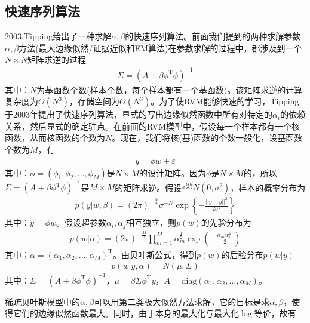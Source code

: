     \subsection{快速序列算法}
        2003.Tipping\cite{2003.Tipping}给出了一种求解$\alpha,\beta$的快速序列算法。前面我们提到的两种求解参数$\alpha,\beta$方法(最大边缘似然/证据近似和EM算法)在参数求解的过程中，都涉及到一个$N\times N$矩阵求逆的过程
        \begin{align*}
        \Sigma = (A+\beta\phi^\mathrm{T}\phi)^{-1}
        \end{align*}
        其中：$N$为基函数个数(样本个数，每个样本都有一个基函数)。该矩阵求逆的计算复杂度为$O(N^3)$，存储空间为$O(N^3)$。为了使RVM能够快速的学习，Tipping于2003年提出了快速序列算法，显式的写出边缘似然函数中所有对特定的$\alpha_i$的依赖关系，然后显式的确定驻点。在前面的RVM模型中，假设每一个样本都有一个核函数，从而核函数的个数为$N$。现在，我们将核(基)函数的个数一般化，设基函数个数为$M$，有
        \begin{align*}
        y = \phi w + \varepsilon
        \end{align*}
        其中：$\phi = (\phi_1,\phi_2,\dots,\phi_M)$是$N\times M$的设计矩阵。因为$\phi $是$N\times M$的，所以$\Sigma = (A+\beta\phi^\mathrm{T}\phi)^{-1}$是$M\times M$的矩阵求逆。假设$\varepsilon \overset{iid}{\sim}N(0,\sigma^2)$，样本的概率分布为
        \begin{align*}
        p(y|w,\beta) = (2\pi)^{-\frac{N}{2}}\sigma^{-N}\exp \left\{ -\frac{||y-\hat{y}||^2}{2\sigma^2} \right\}
        \end{align*}
        其中：$\hat{y} = \phi w$。假设超参数$\alpha_i,\alpha_j$相互独立，则$p(w)$的先验分布为
        \begin{align*}
        p(w|\alpha) = (2\pi)^{-\frac{M}{2}} \prod_{m=1}^M \alpha_m^\frac{1}{2} \exp \left( -\frac{\alpha_mw_m^2}{2} \right)
        \end{align*}
        其中；$\alpha = (\alpha_1,\alpha_2,\dots,\alpha_M)^\mathrm{T}$。由贝叶斯公式，得到$p(w)$的后验分布$p(w|y)$
        \begin{align*}
        p(w|y,\alpha) = N(\mu,\Sigma)
        \end{align*}
        其中：$\Sigma = (A+\beta\phi^\mathrm{T}\phi)^{-1}$，$\mu = \beta \Sigma \phi^\mathrm{T}y$，$A = \mathrm{diag}(\alpha_1,\alpha_2,\dots,\alpha_M)$。
        \par
        稀疏贝叶斯模型中的$\alpha,\beta$可以用第二类极大似然方法求解，它的目标是求$\alpha,\beta$，使得它们的边缘似然函数最大。同时，由于本身的最大化与最大化$\log$等价，故有
